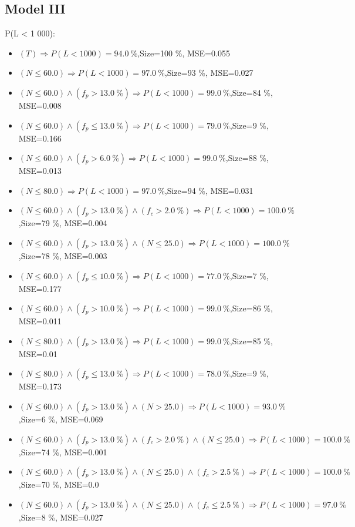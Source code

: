 \documentclass[numbered]{CSL}
\begin{document}
\subsection{Model III}
P(L < 1 000):
\begin{itemize}
\item $(T) \Rightarrow P(L < 1 000) = 94.0~\%$,\hfill Size=100 \%, MSE=0.055
\item $(N \leq 60.0) \Rightarrow P(L < 1 000) = 97.0~\%$,\hfill Size=93 \%, MSE=0.027
\item $(N \leq 60.0) \land (f_p > 13.0~\%) \Rightarrow P(L < 1 000) = 99.0~\%$,\hfill Size=84 \%, MSE=0.008
\item $(N \leq 60.0) \land (f_p \leq 13.0~\%) \Rightarrow P(L < 1 000) = 79.0~\%$,\hfill Size=9 \%, MSE=0.166
\item $(N \leq 60.0) \land (f_p > 6.0~\%) \Rightarrow P(L < 1 000) = 99.0~\%$,\hfill Size=88 \%, MSE=0.013
\item $(N \leq 80.0) \Rightarrow P(L < 1 000) = 97.0~\%$,\hfill Size=94 \%, MSE=0.031
\item $(N \leq 60.0) \land (f_p > 13.0~\%) \land (f_c > 2.0~\%) \Rightarrow P(L < 1 000) = 100.0~\%$,\hfill Size=79 \%, MSE=0.004
\item $(N \leq 60.0) \land (f_p > 13.0~\%) \land (N \leq 25.0) \Rightarrow P(L < 1 000) = 100.0~\%$,\hfill Size=78 \%, MSE=0.003
\item $(N \leq 60.0) \land (f_p \leq 10.0~\%) \Rightarrow P(L < 1 000) = 77.0~\%$,\hfill Size=7 \%, MSE=0.177
\item $(N \leq 60.0) \land (f_p > 10.0~\%) \Rightarrow P(L < 1 000) = 99.0~\%$,\hfill Size=86 \%, MSE=0.011
\item $(N \leq 80.0) \land (f_p > 13.0~\%) \Rightarrow P(L < 1 000) = 99.0~\%$,\hfill Size=85 \%, MSE=0.01
\item $(N \leq 80.0) \land (f_p \leq 13.0~\%) \Rightarrow P(L < 1 000) = 78.0~\%$,\hfill Size=9 \%, MSE=0.173
\item $(N \leq 60.0) \land (f_p > 13.0~\%) \land (N > 25.0) \Rightarrow P(L < 1 000) = 93.0~\%$,\hfill Size=6 \%, MSE=0.069
\item $(N \leq 60.0) \land (f_p > 13.0~\%) \land (f_c > 2.0~\%) \land (N \leq 25.0) \Rightarrow P(L < 1 000) = 100.0~\%$,\hfill Size=74 \%, MSE=0.001
\item $(N \leq 60.0) \land (f_p > 13.0~\%) \land (N \leq 25.0) \land (f_c > 2.5~\%) \Rightarrow P(L < 1 000) = 100.0~\%$,\hfill Size=70 \%, MSE=0.0
\item $(N \leq 60.0) \land (f_p > 13.0~\%) \land (N \leq 25.0) \land (f_c \leq 2.5~\%) \Rightarrow P(L < 1 000) = 97.0~\%$,\hfill Size=8 \%, MSE=0.027

\end{itemize}
\end{document}
